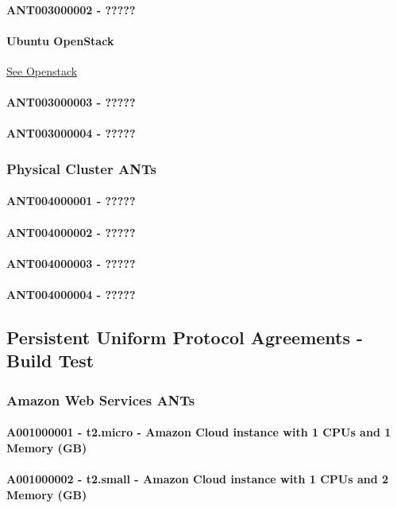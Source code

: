\paragraph{ANT003000002 - ?????}
\paragraph{Ubuntu OpenStack} 
\href{http://www.ubuntu.com/download/cloud/install-ubuntu-openstack}{See Openstack}
\paragraph{ANT003000003 - ?????}
\paragraph{ANT003000004 - ?????}
\subsubsection{Physical Cluster ANTs}
\paragraph{ANT004000001 - ?????}
\paragraph{ANT004000002 - ?????}
\paragraph{ANT004000003 - ?????}
\paragraph{ANT004000004 - ?????}
\subsection{Persistent Uniform Protocol Agreements - Build Test}
\subsubsection{Amazon Web Services ANTs}
\paragraph{A001000001 - t2.micro - Amazon Cloud instance with 1 CPUs and 1 Memory (GB)}
\paragraph{A001000002 - t2.small - Amazon Cloud instance with 1 CPUs and 2 Memory (GB)}
